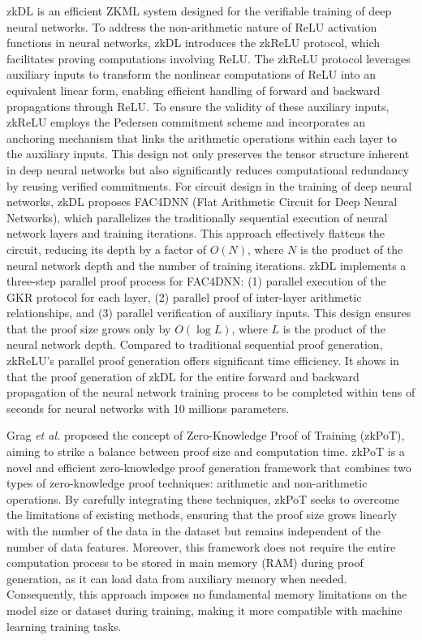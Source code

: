 \documentclass[journal]{IEEEtran}
\begin{document}
zkDL \cite{sun2023zkdl} is an efficient ZKML system designed for the verifiable training of deep neural networks. To address the non-arithmetic nature of ReLU activation functions in neural networks, zkDL introduces the zkReLU protocol, which facilitates proving computations involving ReLU. The zkReLU protocol leverages auxiliary inputs to transform the nonlinear computations of ReLU into an equivalent linear form, enabling efficient handling of forward and backward propagations through ReLU. To ensure the validity of these auxiliary inputs, zkReLU employs the Pedersen commitment scheme and incorporates an anchoring mechanism that links the arithmetic operations within each layer to the auxiliary inputs. This design not only preserves the tensor structure inherent in deep neural networks but also significantly reduces computational redundancy by reusing verified commitments. For circuit design in the training of deep neural networks, zkDL proposes FAC4DNN (Flat Arithmetic Circuit for Deep Neural Networks), which parallelizes the traditionally sequential execution of neural network layers and training iterations. This approach effectively flattens the circuit, reducing its depth by a factor of $O(N)$, where $N$ is the product of the neural network depth and the number of training iterations. zkDL implements a three-step parallel proof process for FAC4DNN: (1) parallel execution of the GKR protocol for each layer, (2) parallel proof of inter-layer arithmetic relationships, and (3) parallel verification of auxiliary inputs. This design ensures that the proof size grows only by $O(\log L)$, where $L$ is the product of the neural network depth. Compared to traditional sequential proof generation, zkReLU's parallel proof generation offers significant time efficiency. It shows in \cite{sun2023zkdl} that the proof generation of zkDL for the entire forward and backward propagation of the neural network training process to be completed within tens of seconds for neural networks with 10 millions parameters.



Grag \emph{et al.} \cite{garg2023experimenting} proposed the concept of Zero-Knowledge Proof of Training (zkPoT), aiming to strike a balance between proof size and computation time. zkPoT is a novel and efficient zero-knowledge proof generation framework that combines two types of zero-knowledge proof techniques: arithmetic and non-arithmetic operations. By carefully integrating these techniques, zkPoT seeks to overcome the limitations of existing methods, ensuring that the proof size grows linearly with the number of the data in the dataset but remains independent of the number of data features. Moreover, this framework does not require the entire computation process to be stored in main memory (RAM) during proof generation, as it can load data from auxiliary memory when needed. Consequently, this approach imposes no fundamental memory limitations on the model size or dataset during training, making it more compatible with machine learning training tasks.
\end{document}
